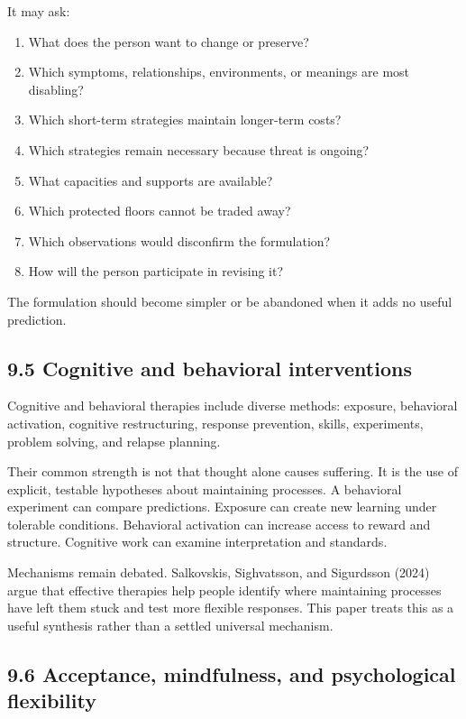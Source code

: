 \documentclass[
  11pt,
]{article}
\providecommand{\tightlist}{%
  \setlength{\itemsep}{0pt}\setlength{\parskip}{0pt}}
\begin{document}
It may ask:

\begin{enumerate}
\def\labelenumi{\arabic{enumi}.}
\tightlist
\item
  What does the person want to change or preserve?
\item
  Which symptoms, relationships, environments, or meanings are most
  disabling?
\item
  Which short-term strategies maintain longer-term costs?
\item
  Which strategies remain necessary because threat is ongoing?
\item
  What capacities and supports are available?
\item
  Which protected floors cannot be traded away?
\item
  Which observations would disconfirm the formulation?
\item
  How will the person participate in revising it?
\end{enumerate}

The formulation should become simpler or be abandoned when it adds no
useful prediction.

\subsection{9.5 Cognitive and behavioral
interventions}\label{cognitive-and-behavioral-interventions}

Cognitive and behavioral therapies include diverse methods: exposure,
behavioral activation, cognitive restructuring, response prevention,
skills, experiments, problem solving, and relapse planning.

Their common strength is not that thought alone causes suffering. It is
the use of explicit, testable hypotheses about maintaining processes. A
behavioral experiment can compare predictions. Exposure can create new
learning under tolerable conditions. Behavioral activation can increase
access to reward and structure. Cognitive work can examine
interpretation and standards.

Mechanisms remain debated. Salkovskis, Sighvatsson, and Sigurdsson
(2024) argue that effective therapies help people identify where
maintaining processes have left them stuck and test more flexible
responses. This paper treats this as a useful synthesis rather than a
settled universal mechanism.

\subsection{9.6 Acceptance, mindfulness, and psychological
flexibility}\label{acceptance-mindfulness-and-psychological-flexibility}
\end{document}
